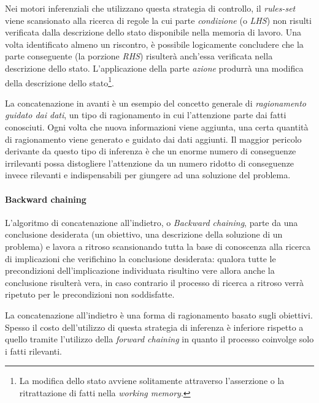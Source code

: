Nei motori inferenziali che utilizzano questa strategia di controllo, il \emph{rules-set} viene scansionato alla ricerca di regole la cui parte \emph{condizione} (o \emph{LHS}) non risulti verificata dalla descrizione dello stato disponibile nella memoria di lavoro. Una volta identificato almeno un riscontro, è possibile logicamente concludere che la parte conseguente (la porzione \emph{RHS}) risulterà anch'essa verificata nella descrizione dello stato. L'applicazione della parte \emph{azione} produrrà una modifica della descrizione dello stato\footnote{La modifica dello stato avviene solitamente attraverso l'asserzione o la ritrattazione di fatti nella \emph{working memory}.}.

La concatenazione in avanti è un esempio del concetto generale di \emph{ragionamento guidato dai dati}, un tipo di ragionamento in cui l'attenzione parte dai fatti conosciuti. Ogni volta che nuova informazioni viene aggiunta, una certa quantità di ragionamento viene generato e guidato dai dati aggiunti. Il maggior pericolo derivante da questo tipo di inferenza è che un enorme numero di conseguenze irrilevanti possa distogliere l'attenzione da un numero ridotto di conseguenze invece rilevanti e indispensabili per giungere ad una soluzione del problema. \cite{russellnorvig2009}

\paragraph{Backward chaining}
L'algoritmo di concatenazione all'indietro, o \emph{Backward chaining}, parte da una conclusione desiderata (un obiettivo, una descrizione della soluzione di un problema) e lavora a ritroso scansionando tutta la base di conoscenza alla ricerca di implicazioni che verifichino la conclusione desiderata: qualora tutte le precondizioni dell'implicazione individuata risultino vere allora anche la conclusione risulterà vera, in caso contrario il processo di ricerca a ritroso verrà ripetuto per le precondizioni non soddisfatte.

La concatenazione all'indietro è una forma di ragionamento basato sugli obiettivi. Spesso il costo dell'utilizzo di questa strategia di inferenza è inferiore rispetto a quello tramite l'utilizzo della \emph{forward chaining} in quanto il processo coinvolge solo i fatti rilevanti. \cite{russellnorvig2009}

